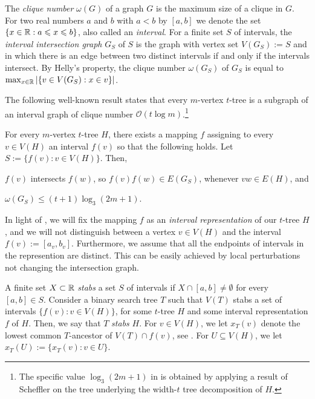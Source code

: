 \documentclass[kpfonts]{patmorin}
\newcommand{\Oh}{\mathcal{O}}
\let\le\leqslant
\let\leq\leqslant
\begin{document}
The \emph{clique number} $\omega(G)$ of a graph $G$ is the maximum size of a clique in $G$. 
For two real numbers $a$ and $b$ with $a<b$ by $[a,b]$ we denote the set $\{ x\in\R: a\le x\le b\}$, also called an \emph{interval}.
For a finite set $S$ of intervals, 
the \emph{interval intersection graph} $G_S$ of $S$ is the graph 
with vertex set $V(G_S):=S$ and in which there is an edge between two distinct intervals 
if and only if the intervals intersect.
By Helly's property, the clique number $\omega(G_S)$ of $G_S$ is equal to $\max_{x\in\mathbb{R}}|\{v\in V(G_S):x\in v\}|$.

The following well-known result states that every $m$-vertex $t$-tree is a subgraph of an interval graph of clique number $\Oh(t\log m)$.\footnote{The specific value $\log_3 (2m+1)$ in  is obtained by applying a result of Scheffler \cite{scheffler:optimal} on the tree underlying the width-$t$ tree decomposition of $H$.}

\begin{lem}
  For every $m$-vertex $t$-tree $H$, there exists a mapping $f$ assigning to every $v\in V(H)$ an interval $f(v)$ so that the following holds. Let $S:=\{f(v):v\in V(H)\}$. Then,
\begin{compactenum}
  \item $f(v)$ intersects $f(w)$, so $f(v)f(w)\in E(G_S)$, whenever $vw\in E(H)$, and 
  \item $\omega(G_S) \leq (t+1)\log_3(2m+1)$.
\end{compactenum}
%
\end{lem}

In light of , 
we will fix the mapping $f$ as an \emph{interval representation} of our $t$-tree $H$, and we will not distinguish between a vertex $v\in V(H)$ and the interval $f(v):=[a_v,b_v]$. 
Furthermore, we assume that all the endpoints of intervals in the represention are distinct. 
This can be easily achieved by local perturbations not changing the intersection graph.

A finite set $X\subset\mathbb{R}$ \emph{stabs} a set $S$ of intervals if $X\cap [a,b]\neq\emptyset$ for every $[a,b]\in S$. 
Consider a binary search tree $T$ such that $V(T)$ stabs a set of intervals $\{f(v):v\in V(H)\}$, for some $t$-tree $H$ and some interval representation $f$ of $H$.  
Then, we say that $T$ \emph{stabs} $H$. 
For $v \in V(H)$, we let $x_T(v)$ denote the lowest common $T$-ancestor of $V(T)\cap f(v)$, see .
For $U \subseteq V(H)$, we let $x_T(U):=\{x_T(v):v\in U\}$.
\end{document}
